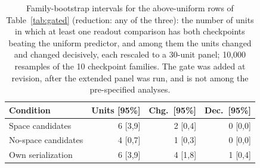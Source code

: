 \begin{table}[t]
\centering\scriptsize
\setlength{\tabcolsep}{4pt}
\begin{tabular}{@{}lrrr@{}}
\toprule
Condition & Units [95\%] & Chg.\ [95\%] & Dec.\ [95\%] \\
\midrule
Space candidates & 6 [3,9] & 2 [0,4] & 0 [0,0] \\
No-space candidates & 4 [0,7] & 1 [0,3] & 0 [0,0] \\
Own serialization & 6 [3,9] & 4 [1,8] & 1 [0,4] \\
\bottomrule
\end{tabular}
\caption{Family-bootstrap intervals for the above-uniform rows of Table~\ref{tab:gated} (reduction: any of the three): the number of units in which at least one readout comparison has both checkpoints beating the uniform predictor, and among them the units changed and changed decisively, each rescaled to a 30-unit panel; 10,000 resamples of the 10 checkpoint families. The gate was added at revision, after the extended panel was run, and is not among the pre-specified analyses.}
\label{tab:gated-boot}
\end{table}

